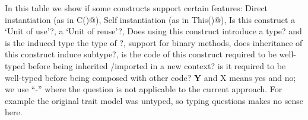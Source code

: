 In this table we show if some constructs support certain features:
Direct instantiation (as in \Q@new C()@),
Self instantiation (as in \Q@new This()@),
Is this construct a `Unit of use'?, a `Unit of reuse'?,
Does using this construct introduce a type? and is the induced type the type of \Q@this@?,
support for binary methods,
does inheritance of this construct induce subtype?,
is the code of this construct required to be well-typed before being inherited /imported in a new context?
is it required to be well-typed before being composed with other code?
\textbf{Y} and X means yes and no; we use ``-'' where the question is not applicable to the current approach. For example the original trait model was untyped, so typing questions makes no sense here.


